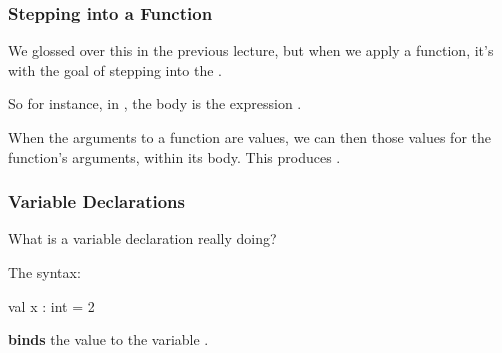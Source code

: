 \documentclass[aspectratio=169]{beamer}
\begin{document}
\begin{frame}[fragile]
  \frametitle{Stepping into a Function}

  We glossed over this in the previous lecture, but when we
  apply a function, it's with the goal of stepping into the
  .

  \pause
  \vspace{\fill}


  \vspace{\fill}

  So for instance, in , the
  body is the expression .

  \pause
  \vspace{\fill}

  When the arguments to a function are values, we can then
   those values for the function's arguments,
  within its body. This produces .
\end{frame}


\begin{frame}[fragile]
  \frametitle{Variable Declarations}

  What is a variable declaration really doing?

  \pause
  \vspace{\fill}

  The syntax:

  \begin{codeblock}
    val x : int = 2
  \end{codeblock}

  \textbf{binds} the value  to the variable .

  \pause
  \vspace{\fill}


  \pause
  \vspace{\fill}

\end{frame}
\end{document}
